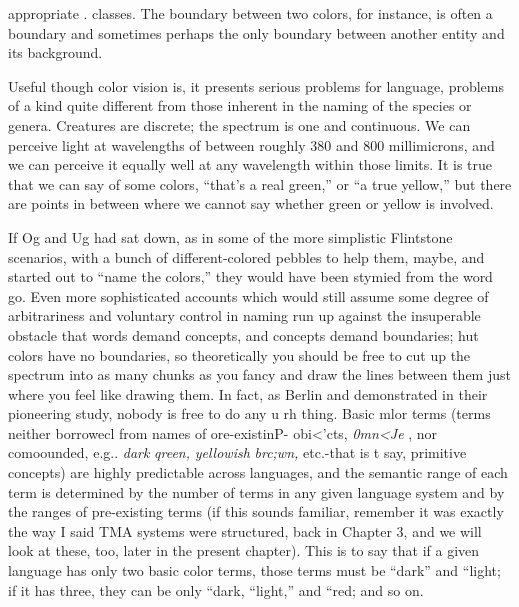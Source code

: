   


 


appropriate . classes. The boundary between two colors, for instance, is often a boundary and sometimes perhaps the only boundary between another entity and its background.

Useful though color vision is, it presents serious problems for language, problems of a kind quite different from those inherent in the naming of the species or genera. Creatures are discrete; the spec\-trum is one and continuous. We can perceive light at wavelengths of between roughly 380 and 800 millimicrons, and we can perceive it equally well at any wavelength within those limits. It is true that we can say of some colors, ``that's a real green,'' or ``a true yellow,'' but there are points in between where we cannot say whether green or yellow is involved.

If Og and Ug had sat down, as in some of the more simplistic Flintstone scenarios, with a bunch of different-colored pebbles to help them, maybe, and started out to ``name the colors,'' they would have been stymied from the word go. Even more sophisticated accounts which would still assume some degree of arbitrariness and voluntary control in naming run up against the insuperable obstacle that words demand concepts, and concepts demand boundaries; hut colors have no boundaries, so theoretically you should be free to cut up the spec\-trum into as many chunks as you fancy and draw the lines between them just where you feel like drawing them. In fact, as Berlin and \citet{Kay1969} demonstrated in their pioneering study, nobody is free to do any u rh thing. Basic mlor terms (terms neither borrowecl from names of ore-existinP- obi{\textless}'cts, \textit{0mn}\textit{{\textless}Je} , nor comoounded, e.g.. \textit{d}\textit{ark} \textit{qreen,} \textit{yellowish} \textit{br}\textit{c}\textit{;}\textit{wn,} etc.-that is t say, primitive concepts) are highly predictable across languages, and the semantic range of each term is determined by the number of terms in any given language system and by the ranges of pre-existing terms (if this sounds familiar, remember it was exactly the way I said TMA systems were structured, back in Chapter 3, and we will look at these, too, later in the present chapter). This is to say that if a given language has only two basic color terms, those terms must be ``dark'' and ``light{\textquotedbl}; if it has three, they can be only ``dark,{\textquotedbl} ``light,'' and ``red{\textquotedbl}; and so on.

